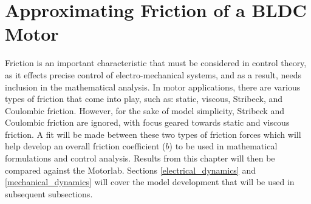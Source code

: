 
\cleardoublepage

\chapter{Approximating Friction of a BLDC Motor}
\label{chp5}

Friction is an important characteristic that must be considered in control theory, as it effects precise control of electro-mechanical systems, and as a result, needs inclusion in the mathematical analysis. In motor applications, there are various types of friction that come into play, such as: static, viscous, Stribeck, and Coulombic friction. However, for the sake of model simplicity, Stribeck and Coulombic friction are ignored, with focus geared towards static and viscous friction. A fit will be made between these two types of friction forces which will help develop an overall friction coefficient ($b$) to be used in mathematical formulations and control analysis. Results from this chapter will then be compared against the Motorlab. Sections \ref{electrical_dynamics} and \ref{mechanical_dynamics} will cover the model development that will be used in subsequent subsections.

\begin{figure}[H]
	\begin{center}
		
	\end{center}
\end{figure}

\begin{figure}[H]
	\begin{center}
		
	\end{center}
\end{figure}

\begin{figure}[H]
	\begin{center}
		
	\end{center}
\end{figure}

